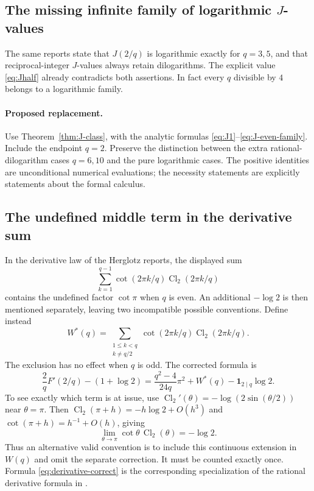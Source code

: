 \documentclass[11pt]{article}
\numberwithin{equation}{section}
\theoremstyle{definition}
\theoremstyle{remark}
\DeclareMathOperator{\Cl}{Cl}
\begin{document}
\subsection{The missing infinite family of logarithmic \texorpdfstring{$J$}{J}-values}

The same reports state that $J(2/q)$ is logarithmic exactly for
$q=3,5$, and that reciprocal-integer $J$-values always retain
dilogarithms. The explicit value \eqref{eq:Jhalf} already
contradicts both assertions. In fact every $q$ divisible by $4$
belongs to a logarithmic family.

\paragraph{Proposed replacement.}
Use Theorem~\ref{thm:J-class}, with the analytic formulas
\eqref{eq:J1}--\eqref{eq:J-even-family}. Include the endpoint
$q=2$. Preserve the distinction between the extra rational-dilogarithm
cases $q=6,10$ and the pure logarithmic cases. The positive identities
are unconditional numerical evaluations; the necessity statements
are explicitly statements about the formal calculus.

\subsection{The undefined middle term in the derivative sum}
\label{sec:derivative-correction}

In the derivative law of the Herglotz reports, the displayed sum
\[
 \sum_{k=1}^{q-1}\cot(2\pi k/q)\Cl_2(2\pi k/q)
\]
contains the undefined factor $\cot\pi$ when $q$ is even. An
additional $-\log2$ is then mentioned separately, leaving two
incompatible possible conventions.
Define instead
\begin{equation}\label{eq:Wstar}
 W^*(q)=\sum_{\substack{1\le k<q\\k\ne q/2}}
       \cot(2\pi k/q)\Cl_2(2\pi k/q).
\end{equation}
The exclusion has no effect when $q$ is odd. The corrected formula is
\begin{equation}\label{eq:derivative-correct}
 \frac2qF'(2/q)-(1+\log2)
 =\frac{q^2-4}{24q}\pi^2+W^*(q)
                  -\mathbf1_{2\mid q}\log2.
\end{equation}
To see exactly which term is at issue, use
$\Cl_2'(\theta)=-\log(2\sin(\theta/2))$ near $\theta=\pi$.
Then $\Cl_2(\pi+h)=-h\log2+O(h^3)$ and
$\cot(\pi+h)=h^{-1}+O(h)$, giving
\[
 \lim_{\theta\to\pi}\cot\theta\,\Cl_2(\theta)=-\log2.
\]
Thus an alternative valid convention is to include this continuous
extension in $W(q)$ and omit the separate correction. It must be
counted exactly once. Formula \eqref{eq:derivative-correct} is the
corresponding specialization of the rational derivative formula in
\cite[Proposition~4]{RZ}.
\end{document}

